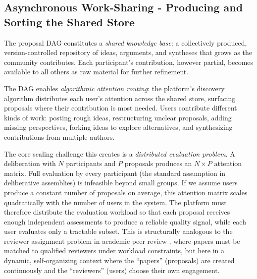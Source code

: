 \documentclass[a4paper, 12pt, twoside]{iviathesis}
\begin{document}
\subsection{Asynchronous Work-Sharing - Producing and Sorting the Shared Store}
\label{sec:async-work-sharing}

The proposal DAG constitutes a \textit{shared knowledge base}: a collectively produced, version-controlled repository of ideas, arguments, and syntheses that grows as the community contributes. Each participant's contribution, however partial, becomes available to all others as raw material for further refinement.

The DAG enables \textit{algorithmic attention routing}: the platform's discovery algorithm distributes each user's attention across the shared store, surfacing proposals where their contribution is most needed. Users contribute different kinds of work: posting rough ideas, restructuring unclear proposals, adding missing perspectives, forking ideas to explore alternatives, and synthesizing contributions from multiple authors.

The core scaling challenge this creates is a \textit{distributed evaluation problem}. A deliberation with $N$ participants and $P$ proposals produces an $N \times P$ attention matrix. Full evaluation by every participant (the standard assumption in deliberative assemblies) is infeasible beyond small groups. If we assume users produce a constant number of proposals on average, this attention matrix scales quadratically with the number of users in the system. The platform must therefore distribute the evaluation workload so that each proposal receives enough independent assessments to produce a reliable quality signal, while each user evaluates only a tractable subset. This is structurally analogous to the reviewer assignment problem in academic peer review \cite{charlin2013}, where papers must be matched to qualified reviewers under workload constraints, but here in a dynamic, self-organizing context where the ``papers'' (proposals) are created continuously and the ``reviewers'' (users) choose their own engagement.
\end{document}
